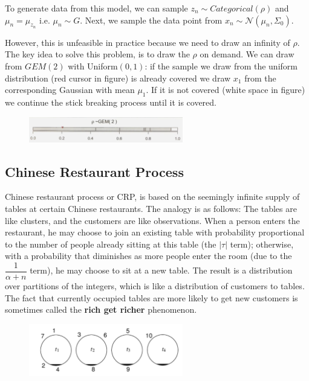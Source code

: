 \documentclass[twoside]{article}
\begin{document}
To generate data from this model, we can sample $z_{n} \sim Categorical(\rho)$ and $\mu_{n} = \mu_{z_{n}}$  i.e. $\mu_{n} \sim G$. Next, we sample the data point from $x_{n} \sim \mathcal{N}(\mu_{n}, \Sigma_{0})$.

However, this is unfeasible in practice because we need to draw an infinity of $\rho$. The key idea to solve this problem, is to draw the $\rho$ on demand. We can draw from $GEM(2)$ with  Uniform$(0,1)$: if the sample we draw from the uniform distribution (red cursor in figure) is already covered we draw $x_{1}$ from the corresponding Gaussian with mean $\mu_{1}$. If it is not covered (white space in figure) we continue the stick breaking process until it is covered. 


\begin{figure}[h]
    \centering
    \includegraphics[width=0.6\textwidth]{img/gem2.png}
\end{figure}
\newpage
\subsection{Chinese Restaurant Process}
Chinese restaurant process or CRP, is based on the seemingly infinite supply of tables at certain Chinese restaurants. 
The analogy is as follows: The tables are like clusters, and the customers are like observations. When a person enters the restaurant, he may choose to join an existing table with probability proportional to the number of people already sitting at this table (the $|\tau|$ term); otherwise, with a probability that diminishes as more people enter the room (due to the $\dfrac{1}{\alpha + n} $ term), he may choose to sit at a new table. The result is a distribution over partitions of the integers, which is like a distribution of customers to tables.
The fact that currently occupied tables are more likely to get new customers is sometimes called the \textbf{rich get richer} phenomenon. 

\begin{figure}[h]
    \centering
    \includegraphics[width=0.6\textwidth]{img/cp.png}
\end{figure}
\end{document}
